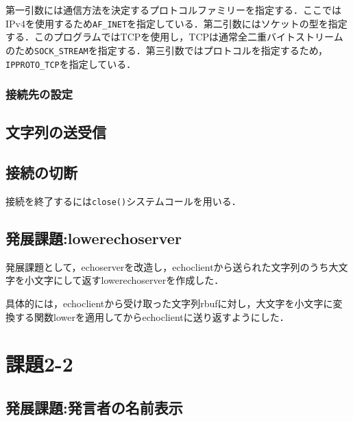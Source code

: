 \documentclass[a4j,10pt,titlepage]{jsarticle}
\begin{document}
第一引数には通信方法を決定するプロトコルファミリーを指定する．ここではIPv4を使用するため\verb|AF_INET|を指定している．第二引数にはソケットの型を指定する．このプログラムではTCPを使用し，TCPは通常全二重バイトストリームのため\verb|SOCK_STREAM|を指定する．第三引数ではプロトコルを指定するため，\verb|IPPROTO_TCP|を指定している．

\subsubsection{接続先の設定}


\subsection{文字列の送受信}


\subsection{接続の切断}
接続を終了するには\verb|close()|システムコールを用いる．

\subsection{発展課題:lowerechoserver}
発展課題として，echoserverを改造し，echoclientから送られた文字列のうち大文字を小文字にして返すlowerechoserverを作成した．

具体的には，echoclientから受け取った文字列rbufに対し，大文字を小文字に変換する関数lowerを適用してからechoclientに送り返すようにした．

\section{課題2-2}
\subsection{発展課題:発言者の名前表示}
\end{document}

